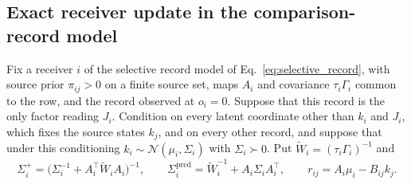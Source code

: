 \subsection{Exact receiver update in the comparison-record model}\label{app:sp_receiver_update}
Fix a receiver $i$ of the selective record model of Eq.~\eqref{eq:selective_record}, with source prior $\pi_{ij}>0$ on a finite source set, maps $A_i$ and covariance $\tau_i\Gamma_i$ common to the row, and the record observed at $o_i=0$. Suppose that this record is the only factor reading $J_i$. Condition on every latent coordinate other than $k_i$ and $J_i$, which fixes the source states $k_j$, and on every other record, and suppose that under this conditioning $k_i\sim\mathcal N(\mu_i,\Sigma_i)$ with $\Sigma_i\succ0$. Put $\widetilde W_i=(\tau_i\Gamma_i)^{-1}$ and
\begin{equation}
\Sigma_i^+=\big(\Sigma_i^{-1}+A_i^\top\widetilde W_iA_i\big)^{-1},\qquad
\Sigma_i^{\mathrm{pred}}=\widetilde W_i^{-1}+A_i\Sigma_iA_i^\top,\qquad
r_{ij}=A_i\mu_i-B_{ij}k_j.
\label{eq:sp_receiver_defs}
\end{equation}

